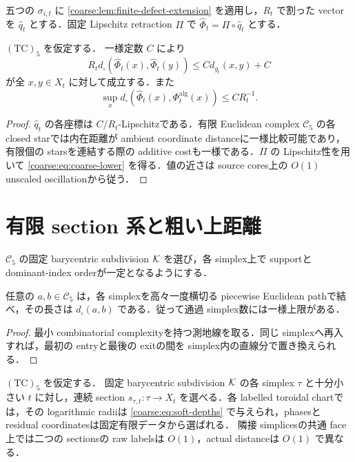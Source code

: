 \documentclass[a4paper,11pt]{ltjsarticle}
\numberwithin{equation}{section}
\theoremstyle{plain}
\theoremstyle{definition}
\theoremstyle{remark}
\newcommand{\Cfive}{\mathcal C_5}\newcommand{\dsq}{d_{\square}}\newcommand{\Lt}{L_t}\newcommand{\Rt}{R_t}
\begin{document}
五つの $\sigma_{i,t}$ に \cref{coarse:lem:finite-defect-extension} を適用し，$R_t$ で割った vectorを $\widehat q_t$ とする．固定 Lipschitz retraction $\Pi$ で $\widehat\Phi_t=\Pi\circ\widehat q_t$ とする．

\begin{proposition}[粗い距離下界]\label{coarse:prop:coarse-lower}
$\mathrm{(TC)}_5$ を仮定する．
一様定数 $C$ により
\begin{equation}\label{coarse:eq:coarse-lower}
 R_t d_\square(\widehat\Phi_t(x),\widehat\Phi_t(y))
 \le C d_{g_t}(x,y)+C
\end{equation}
が全 $x,y\in X_t$ に対して成立する．また
\[
 \sup_xd_\square(\widehat\Phi_t(x),\Phi_t^{\mathrm{alg}}(x))\le CR_t^{-1}.
\]
\end{proposition}

\begin{proof}
$\widehat q_t$ の各座標は $C/R_t$-Lipschitzである．有限 Euclidean complex $\Cfive$ の各 closed starでは内在距離が ambient coordinate distanceに一様比較可能であり，有限個の starsを連結する際の additive costも一様である．$\Pi$ の Lipschitz性を用いて \eqref{coarse:eq:coarse-lower} を得る．値の近さは source cores上の $O(1)$ unscaled oscillationから従う．
\end{proof}

\section{有限 section 系と粗い上距離}\label{coarse:sec:sections}

$\Cfive$ の固定 barycentric subdivision $\mathcal K$ を選び，各 simplex上で supportと dominant-index orderが一定となるようにする．

\begin{lemma}[有限 gallery]\label{coarse:lem:finite-gallery}
任意の $a,b\in\Cfive$ は，各 simplexを高々一度横切る piecewise Euclidean pathで結べ，その長さは $d_\square(a,b)$ である．従って通過 simplex数には一様上限がある．
\end{lemma}

\begin{proof}
最小 combinatorial complexityを持つ測地線を取る．同じ simplexへ再入すれば，最初の entryと最後の exitの間を simplex内の直線分で置き換えられる．
\end{proof}

\begin{lemma}\label{coarse:lem:toroidal-sections}
$\mathrm{(TC)}_5$ を仮定する．
固定 barycentric subdivision $\mathcal K$ の各 simplex $\tau$ と十分小さい $t$ に対し，連続 section
$s_{\tau,t}:\tau\to X_t$ を選べる．各 labelled toroidal chartでは，その logarithmic radiiは
\eqref{coarse:eq:soft-depths} で与えられ，phasesと residual coordinatesは固定有限データから選ばれる．
隣接 simplicesの共通 face上では二つの sectionsの raw labelsは $O(1)$，actual distanceは $O(1)$ で異なる．
\end{lemma}
\end{document}
